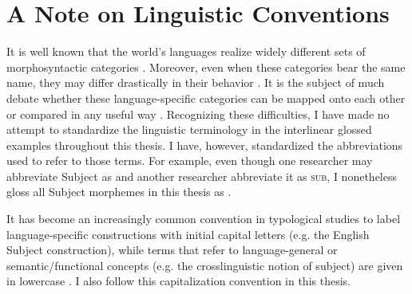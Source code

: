 \chapter*{A Note on Linguistic Conventions}
\label{ch:conventions}

It is well known that the world's languages realize widely different sets of morphosyntactic categories \parencites[58]{Whaley1997}{Haspelmath2007}. Moreover, even when these categories bear the same name, they may differ drastically in their behavior \parencite[9]{Dixon2010}. It is the subject of much debate whether these language-specific categories can be mapped onto each other or compared in any useful way \parencites[13--19]{Croft2003}{Haspelmath2010a}{Haspelmath2010b}{Newmeyer2010}[308--310]{Hieber2013}{Croft2014}{Plank2016}. Recognizing these difficulties, I have made no attempt to standardize the linguistic terminology in the interlinear glossed examples throughout this thesis. I have, however, standardized the abbreviations used to refer to those terms. For example, even though one researcher may abbreviate Subject as  and another researcher abbreviate it as \textsc{sub}, I nonetheless gloss all Subject morphemes in this thesis as .

It has become an increasingly common convention in typological studies to label language\hyp{}specific constructions with initial capital letters (e.g. the English Subject construction), while terms that refer to language-general or semantic/functional concepts (e.g. the crosslinguistic notion of subject) are given in lowercase \parencites[674]{Haspelmath2010a}[535]{Croft2014}. I also follow this capitalization convention in this thesis.

